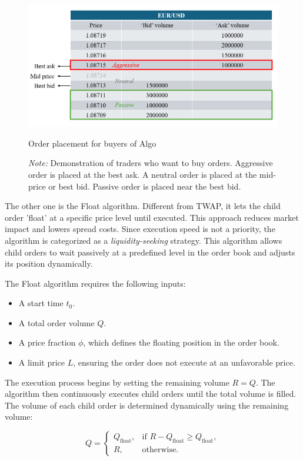 \begin{figure}[htbp]
    \centering
    \includegraphics[width=\linewidth]{figures/order placement.png}
    \caption{Order placement for buyers of Algo}
    \caption*{\textit{Note:} Demonstration of traders who want to buy orders. Aggressive order is placed at the best ask. A neutral order is placed at the mid-price or best bid. Passive order is placed near the best bid.}
    \label{fig:order placement}
\end{figure}

The other one is the Float algorithm. Different from TWAP, it lets the child order 'float' at a specific price level until executed. This approach reduces market impact and lowers spread costs. Since execution speed is not a priority, the algorithm is categorized as a \textit{liquidity-seeking} strategy. This algorithm allows child orders to wait passively at a predefined level in the order book and adjusts its position dynamically.

The Float algorithm requires the following inputs:
\begin{itemize}
    \item A start time $t_0$.
    \item A total order volume $Q$.
    \item A price fraction $\phi$, which defines the floating position in the order book.
    \item A limit price $L$, ensuring the order does not execute at an unfavorable price.
\end{itemize}

The execution process begins by setting the remaining volume $R = Q$. The algorithm then continuously executes child orders until the total volume is filled. The volume of each child order is determined dynamically using the remaining volume:

\begin{equation}
    Q = 
    \begin{cases} 
        Q_{\text{float}}, & \text{if } R - Q_{\text{float}} \geq Q_{\text{float}}, \\
        R, & \text{otherwise}.
    \end{cases}
\end{equation}

